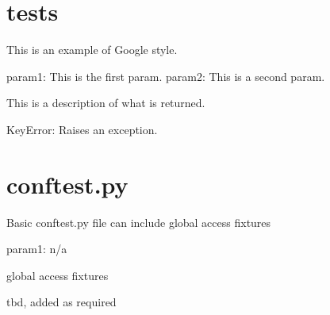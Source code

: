 \documentclass[letterpaper,10pt,english]{sphinxmanual}
\begin{document}
\chapter{tests}
\label{\detokenize{index:module-tests.test_class}}\label{\detokenize{index:tests}}
\sphinxAtStartPar
This is an example of Google style.
\begin{description}
\sphinxAtStartPar
param1: This is the first param.
param2: This is a second param.

\sphinxAtStartPar
This is a description of what is returned.

\sphinxAtStartPar
KeyError: Raises an exception.

\end{description}


\chapter{conftest.py}
\label{\detokenize{index:module-conftest}}\label{\detokenize{index:conftest-py}}
\sphinxAtStartPar
Basic conftest.py file
can include global access fixtures
\begin{description}
\sphinxAtStartPar
param1: n/a

\sphinxAtStartPar
global access fixtures

\sphinxAtStartPar
tbd, added as required

\end{description}


\renewcommand{\indexname}{Python Module Index}
\begin{sphinxtheindex}
\let\bigletter\sphinxstyleindexlettergroup
\bigletter{c}
\item\relax{}
\indexspace
\bigletter{s}
\item\relax{}
\indexspace
\bigletter{t}
\item\relax{}
\end{sphinxtheindex}

\renewcommand{\indexname}{Index}
\printindex
\end{document}

